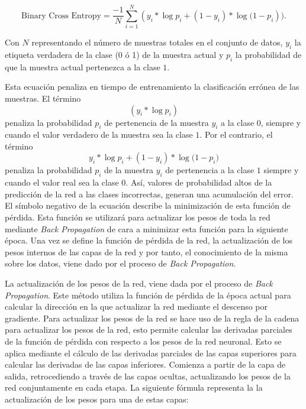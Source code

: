 $$\text{Binary Cross Entropy} = \frac{-1}{N} \sum_{i=1}^{N} (y_{i}*\log{p_{i}}+ (1 - y_{i})*\log{(1-p_{i}})).$$

Con $N$ representando el número de muestras totales en el conjunto de datos, $y_i$ la etiqueta verdadera de la clase (0 ó 1) de la muestra actual y $p_i$ la probabilidad de que la muestra actual pertenezca a la clase $1$.

Esta ecuación penaliza en tiempo de entrenamiento la clasificación errónea de las muestras. El término $$(y_{i}*\log p_{i})$$ penaliza la probabilidad $p_i$ de pertenencia de la muestra $y_i$ a la clase $0$, siempre y cuando el valor verdadero de la muestra sea la clase $1$. Por el contrario, el término 
$$y_{i}*\log{p_{i}}+ (1 - y_{i})*\log{(1-p_{i}})$$
penaliza la probabilidad $p_i$ de la muestra $y_i$ de pertenencia a la clase $1$ siempre y cuando el valor real sea la clase $0$. Así, valores de probabilidad altos de la predicción de la red a las clases incorrectas, generan una acumulación del error. El símbolo negativo de la ecuación describe la minimización de esta función de pérdida. Esta función se utilizará para actualizar los pesos de toda la red mediante \textit{Back Propagation} de cara a minimizar esta función para la siguiente época. Una vez se define la función de pérdida de la red, la actualización de los pesos internos de las capas de la red y por tanto, el conocimiento de la misma sobre los datos, viene dado por el proceso de \textit{Back Propagation}.





La actualización de los pesos de la red, viene dada por el proceso de \textit{Back Propagation}. Este método utiliza la función de pérdida de la época actual para calcular la dirección en la que actualizar la red mediante el descenso por gradiente. Para actualizar los pesos de la red se hace uso de la regla de la cadena para actualizar los pesos de la red, esto permite calcular las derivadas parciales de la función de pérdida con respecto a los pesos de la red neuronal. Esto se aplica mediante el cálculo de las derivadas parciales de las capas superiores para calcular las derivadas de las capas inferiores. Comienza a partir de la capa de salida, retrocediendo a través de las capas ocultas, actualizando los pesos de la red conjuntamente en cada etapa. La siguiente fórmula representa la la actualización de los pesos para una de estas capas:


